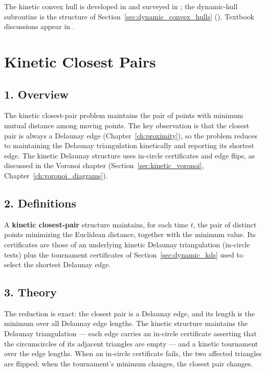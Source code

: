 The kinetic convex hull is developed in \cite{basch1999} and surveyed in
\cite{guibas1998}; the dynamic-hull subroutine is the structure of
Section~\ref{sec:dynamic_convex_hulls} (\cite{overmars1981,overmars1983}).
Textbook discussions appear in \cite{berg2008,mehta2005}.

\section{Kinetic Closest Pairs}
\label{sec:dynamic_kinetic_closest}

\subsection{1. Overview}

The kinetic closest-pair problem maintains the pair of points with minimum
mutual distance among moving points. The key observation is that the closest
pair is always a Delaunay edge (Chapter~\ref{ch:proximity}), so the problem
reduces to maintaining the Delaunay triangulation kinetically and reporting
its shortest edge. The kinetic Delaunay structure uses in-circle
certificates and edge flips, as discussed in the Voronoi chapter
(Section~\ref{sec:kinetic_voronoi}, Chapter~\ref{ch:voronoi_diagrams}).

\subsection{2. Definitions}

\begin{definition}\label{def:kinetic_closest_pair}
  A \textbf{kinetic closest-pair} structure maintains, for each time $t$,
  the pair of distinct points minimizing the Euclidean distance, together
  with the minimum value. Its certificates are those of an underlying kinetic
  Delaunay triangulation (in-circle tests) plus the tournament certificates
  of Section~\ref{sec:dynamic_kds} used to select the shortest Delaunay
  edge.
\end{definition}

\subsection{3. Theory}

The reduction is exact: the closest pair is a Delaunay edge, and its length
is the minimum over all Delaunay edge lengths. The kinetic structure
maintains the Delaunay triangulation --- each edge carries an in-circle
certificate asserting that the circumcircles of its adjacent triangles are
empty --- and a kinetic tournament over the edge lengths. When an in-circle
certificate fails, the two affected triangles are flipped; when the
tournament's minimum changes, the closest pair changes.

